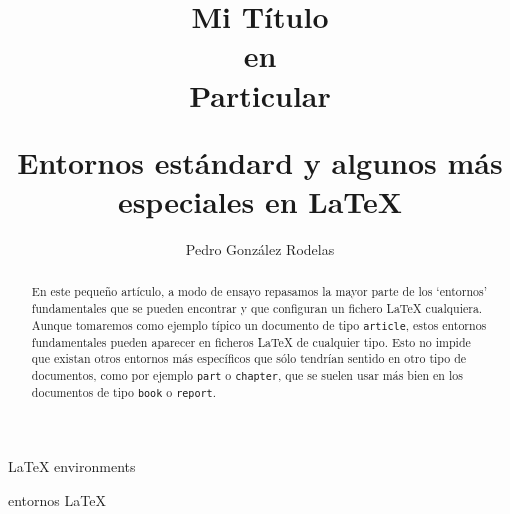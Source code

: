 \documentclass[a4]{article}
\title
{
	\HRule
	\begin{flushright}
		\huge
		\textbf{Mi Tí­tulo}\\
		\Large
		\textbf{en}\\
		\Huge
		\textbf{Particular}\\
	\end{flushright}
	\HRule
}
\author{Pedro González Rodelas}
\date{}%
\title{ Entornos estándard y algunos más especiales en \LaTeX}
\begin{document}
\maketitle
\thispagestyle{empty} %


\begin{abstract}
	\blindtext
\end{abstract}

\begin{keywordsen}
	 {\LaTeX} environments
\end{keywordsen}



\begin{abstract}
	En este pequeño artí­culo, a modo de ensayo repasamos la mayor parte de los `entornos' fundamentales que se pueden encontrar y que configuran un fichero {\LaTeX} cualquiera. Aunque tomaremos como ejemplo tí­pico un documento de tipo {\tt article}, estos entornos fundamentales pueden aparecer en ficheros {\LaTeX} de cualquier tipo. Esto no impide que existan otros entornos más especí­ficos  que sólo tendrí­an sentido en otro tipo de documentos, como por ejemplo {\tt part} o {\tt chapter}, que se suelen usar más bien en los documentos de tipo  {\tt book} o {\tt report}.
\end{abstract}

\begin{keywordses}
	entornos {\LaTeX}
\end{keywordses}
\end{document}
